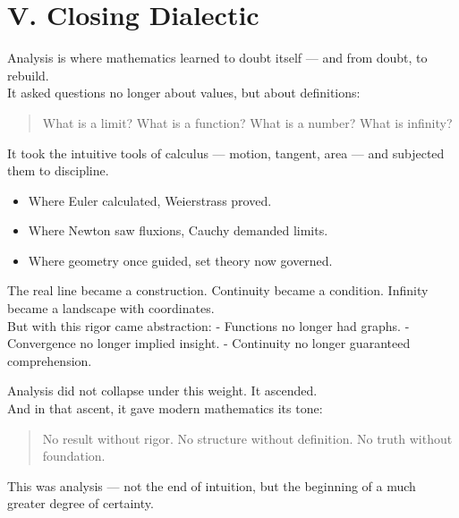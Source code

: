\documentclass[9pt]{article}
\begin{document}
\newpage

\section*{V. Closing Dialectic}

\noindent
Analysis is where mathematics learned to doubt itself —  
and from doubt, to rebuild.\\

\noindent
It asked questions no longer about values, but about definitions:
\begin{quote}
What is a limit?  
What is a function?  
What is a number?  
What is infinity?
\end{quote}

\vspace{1em}

\noindent
It took the intuitive tools of calculus —  
motion, tangent, area — and subjected them to discipline.

\begin{itemize}
  \item Where Euler calculated, Weierstrass proved.
  \item Where Newton saw fluxions, Cauchy demanded limits.
  \item Where geometry once guided, set theory now governed.
\end{itemize}

\noindent
The real line became a construction.  
Continuity became a condition.  
Infinity became a landscape with coordinates.\\

\noindent
But with this rigor came abstraction:
- Functions no longer had graphs.
- Convergence no longer implied insight.
- Continuity no longer guaranteed comprehension.

Analysis did not collapse under this weight.  
It ascended.\\

\noindent
And in that ascent, it gave modern mathematics its tone:  
\begin{quote}
No result without rigor.  
No structure without definition.  
No truth without foundation.
\end{quote}

\noindent
This was analysis —  
not the end of intuition,  
but the beginning of a much greater degree of certainty.
\end{document}
